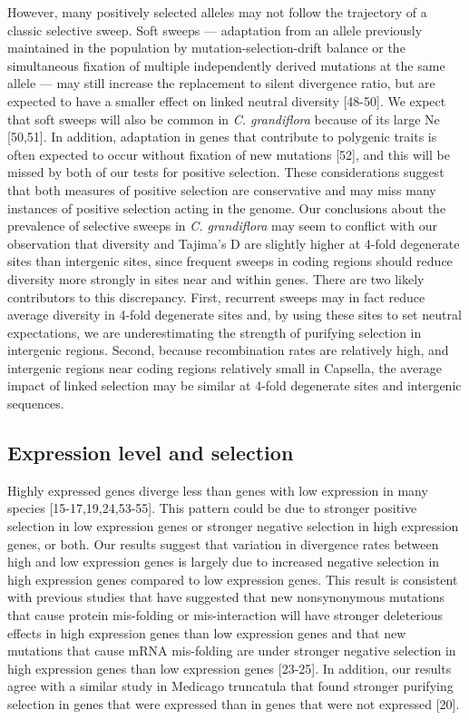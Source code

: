 However, many positively selected alleles may not follow the trajectory of a classic selective sweep. Soft sweeps — adaptation from an allele previously maintained in the population by mutation-selection-drift balance or the simultaneous fixation of multiple independently derived mutations at the same allele — may still increase the replacement to silent divergence ratio, but are expected to have a smaller effect on linked neutral diversity [48-50]. We expect that soft sweeps will also be common in \textit{C. grandiflora} because of its large Ne [50,51]. In addition, adaptation in genes that contribute to polygenic traits is often expected to occur without fixation of new mutations [52], and this will be missed by both of our tests for positive selection. These considerations suggest that both measures of positive selection are conservative and may miss many instances of positive selection acting in the genome.
Our conclusions about the prevalence of selective sweeps in \textit{C. grandiflora} may seem to conflict with our observation that diversity and Tajima's D are slightly higher at 4-fold degenerate sites than intergenic sites, since frequent sweeps in coding regions should reduce diversity more strongly in sites near and within genes. There are two likely contributors to this discrepancy. First, recurrent sweeps may in fact reduce average diversity in 4-fold degenerate sites and, by using these sites to set neutral expectations, we are underestimating the strength of purifying selection in intergenic regions. Second, because recombination rates are relatively high, and intergenic regions near coding regions relatively small in Capsella, the average impact of linked selection may be similar at 4-fold degenerate sites and intergenic sequences. 

\subsection{Expression level and selection}
	Highly expressed genes diverge less than genes with low expression in many species [15-17,19,24,53-55]. This pattern could be due to stronger positive selection in low expression genes or stronger negative selection in high expression genes, or both. Our results suggest that variation in divergence rates between high and low expression genes is largely due to increased negative selection in high expression genes compared to low expression genes. This result is consistent with previous studies that have suggested that new nonsynonymous mutations that cause protein mis-folding or mis-interaction will have stronger deleterious effects in high expression genes than low expression genes and that new mutations that cause mRNA mis-folding are under stronger negative selection in high expression genes than low expression genes [23-25]. In addition, our results agree with a similar study in Medicago truncatula that found stronger purifying selection in genes that were expressed than in genes that were not expressed [20]. 


